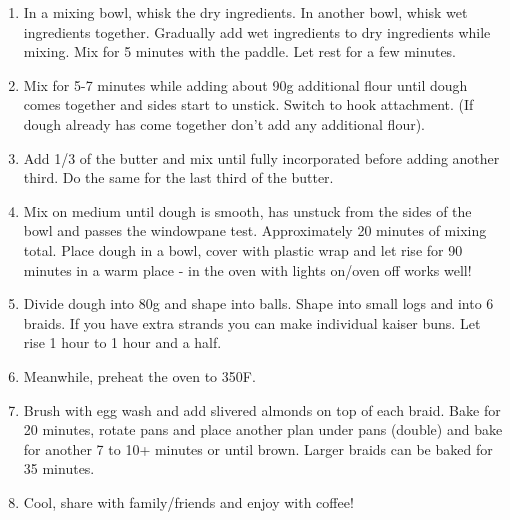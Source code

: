 \begin{enumerate}
    \item  In a mixing bowl, whisk the dry ingredients. In another bowl, whisk wet ingredients together. Gradually add wet ingredients to dry ingredients while mixing. Mix for 5 minutes with the paddle. Let rest for a few minutes.
    \item  Mix for 5-7 minutes while adding about 90g additional flour until dough comes together and sides start to unstick. Switch to hook attachment. (If dough already has come together don't add any additional flour).
    \item  Add 1/3 of the butter and mix until fully incorporated before adding another third. Do the same for the last third of the butter.
    \item  Mix on medium until dough is smooth, has unstuck from the sides of the bowl and passes the windowpane test. Approximately 20 minutes of mixing total. Place dough in a bowl, cover with plastic wrap and let rise for 90 minutes in a warm place - in the oven with lights on/oven off works well!
    \item  Divide dough into 80g and shape into balls. Shape into small logs and into 6 braids. If you have extra strands you can make individual kaiser buns. Let rise 1 hour to 1 hour and a half. 
    \item  Meanwhile, preheat the oven to 350\degree F.
    \item  Brush with egg wash and add slivered almonds on top of each braid. Bake for 20 minutes, rotate pans and place another plan under pans (double) and bake for another 7 to 10+ minutes or until brown. Larger braids can be baked for 35 minutes.
    \item  Cool, share with family/friends and enjoy with coffee!
\end{enumerate}

